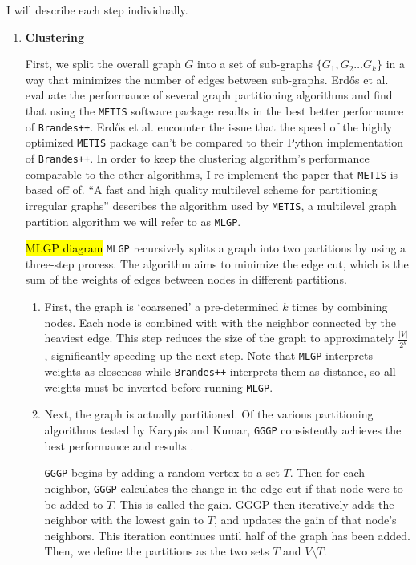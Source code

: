 \documentclass[12pt,a4paper,twoside,openright]{report}
\newcommand{\ttt}[1]{\texttt{#1}}
\newcommand{\erdos}{Erd\H{o}s }
\begin{document}
	I will describe each step individually.
	\begin{enumerate}[label = \textbf{\arabic*.}]
		\item \textbf{Clustering}
		
		First, we split the overall graph $G$ into a set of sub-graphs $\{G_1,G_2 \ldots G_k\}$ in a way that minimizes the number of edges between sub-graphs. \erdos et al. evaluate the performance of several graph partitioning algorithms and find that using the \ttt{METIS} software package results in the best better performance of \ttt{Brandes++}. \erdos et al. encounter the issue that the speed of the highly optimized \ttt{METIS} package can't be compared to their Python implementation of \ttt{Brandes++}. In order to keep the clustering algorithm's performance comparable to the other algorithms, I re-implement the paper that \ttt{METIS} is based off of. ``A fast and high quality multilevel scheme for partitioning irregular graphs''\cite{mlgp} describes the algorithm used by \ttt{METIS}, a multilevel graph partition algorithm we will refer to as \ttt{MLGP}.
		
		\hl{MLGP diagram}
		\ttt{MLGP} recursively splits a graph into two partitions by using a three-step process. The algorithm aims to minimize the edge cut, which is the sum of the weights of edges between nodes in different partitions. 
		\begin{enumerate}[label = \arabic*.]
			\item First, the graph is `coarsened' a pre-determined $k$ times by combining nodes. Each node is combined with with the neighbor connected by the heaviest edge. This step reduces the size of the graph to approximately $\frac{|V|}{2^k}$, significantly speeding up the next step. Note that \ttt{MLGP} interprets weights as closeness while \ttt{Brandes++} interprets them as distance, so all weights must be inverted before running \ttt{MLGP}.
			
			\item Next, the graph is actually partitioned. Of the various partitioning algorithms tested by Karypis and Kumar, \ttt{GGGP} consistently achieves the best performance and results \cite{mlgp}. 
			
			\ttt{GGGP} begins by adding a random vertex to a set $T$. Then for each neighbor, \ttt{GGGP} calculates the change in the edge cut if that node were to be added to $T$. This is called the gain. GGGP then iteratively adds the neighbor with the lowest gain to $T$, and updates the gain of that node's neighbors. This iteration continues until half of the graph has been added. Then, we define the partitions as the two sets $T$ and $V \setminus T$.
			

\end{enumerate}
\end{enumerate}
\end{document}
